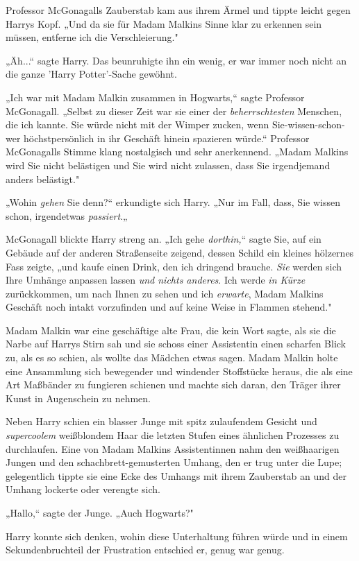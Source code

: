{Professor McGonagalls Zauberstab kam aus ihrem Ärmel und tippte leicht gegen Harrys Kopf. „Und da sie für Madam Malkins Sinne klar zu erkennen sein müssen, entferne ich die Verschleierung."

„Äh...“ sagte Harry. Das beunruhigte ihn ein wenig, er war immer noch nicht an die ganze 'Harry Potter'-Sache gewöhnt.

„Ich war mit Madam Malkin zusammen in Hogwarts,“ sagte Professor McGonagall. „Selbst zu dieser Zeit war sie einer der \emph{beherrschtesten} Menschen, die ich kannte. Sie würde nicht mit der Wimper zucken, wenn Sie-wissen-schon-wer höchstpersönlich in ihr Geschäft hinein spazieren würde.“ Professor McGonagalls Stimme klang nostalgisch und sehr anerkennend. „Madam Malkins wird Sie nicht belästigen und Sie wird nicht zulassen, dass Sie irgendjemand anders belästigt."

„Wohin \emph{gehen} Sie denn?“ erkundigte sich Harry. „Nur im Fall, dass, Sie wissen schon, irgendetwas \emph{passiert}.„

McGonagall blickte Harry streng an. „Ich gehe \emph{dorthin,}“ sagte Sie, auf ein Gebäude auf der anderen Straßenseite zeigend, dessen Schild ein kleines hölzernes Fass zeigte, „und kaufe einen Drink, den ich dringend brauche. \emph{Sie} werden sich Ihre Umhänge anpassen lassen \emph{und nichts anderes}. Ich werde \emph{in Kürze} zurückkommen, um nach Ihnen zu sehen und ich \emph{erwarte}, Madam Malkins Geschäft noch intakt vorzufinden und auf keine Weise in Flammen stehend."

Madam Malkin war eine geschäftige alte Frau, die kein Wort sagte, als sie die Narbe auf Harrys Stirn sah und sie schoss einer Assistentin einen scharfen Blick zu, als es so schien, als wollte das Mädchen etwas sagen. Madam Malkin holte eine Ansammlung sich bewegender und windender Stoffstücke heraus, die als eine Art Maßbänder zu fungieren schienen und machte sich daran, den Träger ihrer Kunst in Augenschein zu nehmen.

Neben Harry schien ein blasser Junge mit spitz zulaufendem Gesicht und \emph{supercoolem} weißblondem Haar die letzten Stufen eines ähnlichen Prozesses zu durchlaufen. Eine von Madam Malkins Assistentinnen nahm den weißhaarigen Jungen und den schachbrett-gemusterten Umhang, den er trug unter die Lupe; gelegentlich tippte sie eine Ecke des Umhangs mit ihrem Zauberstab an und der Umhang lockerte oder verengte sich.

„Hallo,“ sagte der Junge. „Auch Hogwarts?"

Harry konnte sich denken, wohin diese Unterhaltung führen würde und in einem Sekundenbruchteil der Frustration entschied er, genug war genug.

}
